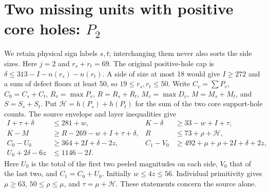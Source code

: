 \documentclass[11pt,letterpaper]{article}
\theoremstyle{definition}\newtheorem{definition}[theorem]{Definition}
\begin{document}
\section{Two missing units with positive core holes: $P_2$}\label{sec:p2}
We retain physical sign labels $s,t$; interchanging them never also sorts the
side sizes. Here $j=2$ and $r_s+r_t=69$. The original positive-hole cap is $\delta\le313-I-n(r_s)-n(r_t)$. A side of size at most 18 would give $I\ge272$ and a sum of defect floors at least 50, so $19\le r_s,r_t\le50$.
Write $C_v=\sum P_v$, $C_0=C_s+C_t$, $R_v=\max P_v$, $R=R_s+R_t$,
$M_v=\max D_v$, $M=M_s+M_t$, and $S=S_s+S_t$. Put
$\mathcal H=h(P_s)+h(P_t)$ for the sum of the two core support-hole counts.
The source envelope and layer inequalities give
\begin{align}
 I+\tau+\delta&\le281+w,& K-\delta&\ge33-w+I+\tau,\label{eq:p2-source}\\
 K-M&\ge R-269-w+I+\tau+\delta, &R&\le73+\rho+\mathcal H,\nonumber\\
 C_0-U_0&\ge364+2I+\delta-2z,& C_1-V_0&\ge492+\mu+\rho+2I+\delta+2z,\nonumber\\
 U_0+2\delta-6z&\le1146-2I.&&\nonumber
\end{align}
Here $U_0$ is the total of the first two peeled magnitudes on each side,
$V_0$ that of the last two, and $C_1=C_0+U_0$. Initially $w\le4z\le56$.
Individual primitivity gives $\mu\ge63$, $50\le\rho\le\mu$, and
$\tau=\mu+\mathcal H$. These statements concern the source alone.
\end{document}
